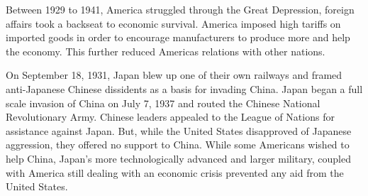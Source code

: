 Between 1929 to 1941, America struggled through the Great Depression, foreign affairs took a backseat to economic survival.
America imposed high tariffs on imported goods in order to encourage manufacturers to produce more and help the economy.
This further reduced Americas relations with other nations.

On September 18, 1931, Japan blew up one of their own railways and framed anti-Japanese Chinese dissidents as a basis for invading China.
Japan began a full scale invasion of China on July 7, 1937 and routed the Chinese National Revolutionary Army.
Chinese leaders appealed to the League of Nations for assistance against Japan.
But, while the United States disapproved of Japanese aggression, they offered no support to China.
While some Americans wished to help China, Japan's more technologically advanced and larger military, coupled with America still dealing with an economic crisis prevented any aid from the United States.